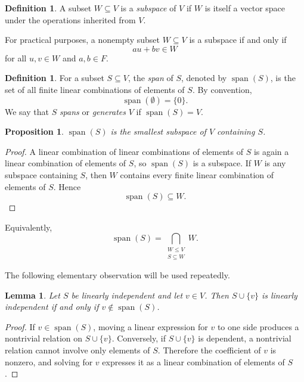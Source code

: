 \documentclass{amsbook}
\newtheorem{lemma}[theorem]{Lemma}
\newtheorem{proposition}[theorem]{Proposition}
\theoremstyle{definition}
\newtheorem{definition}[theorem]{Definition}
\theoremstyle{remark}
\numberwithin{section}{chapter}
\numberwithin{equation}{chapter}
\begin{document}
\begin{definition}
	A subset $W\subseteq V$ is a \emph{subspace} of $V$ if $W$ is itself a vector space under the operations inherited from $V$.
\end{definition}

For practical purposes, a nonempty subset $W\subseteq V$ is a subspace if and only if
\[
au+bv\in W
\]
for all $u,v\in W$ and $a,b\in F$.

\begin{definition}
	For a subset $S\subseteq V$, the \emph{span} of $S$, denoted by $\operatorname{span}(S)$, is the set of all finite linear combinations of elements of $S$. By convention,
	\[
	\operatorname{span}(\emptyset)=\{0\}.
	\]
	We say that $S$ \emph{spans} or \emph{generates} $V$ if $\operatorname{span}(S)=V$.
\end{definition}

\begin{proposition}\label{prop:span-smallest}
	$\operatorname{span}(S)$ is the smallest subspace of $V$ containing $S$.
\end{proposition}

\begin{proof}
	A linear combination of linear combinations of elements of $S$ is again a linear combination of elements of $S$, so $\operatorname{span}(S)$ is a subspace. If $W$ is any subspace containing $S$, then $W$ contains every finite linear combination of elements of $S$. Hence
	\[
	\operatorname{span}(S)\subseteq W.
	\]
\end{proof}

Equivalently,
\[
\operatorname{span}(S)
=
\bigcap_{\substack{W\le V\\S\subseteq W}}W.
\]

The following elementary observation will be used repeatedly.

\begin{lemma}\label{lem:add-independent}
	Let $S$ be linearly independent and let $v\in V$. Then $S\cup\{v\}$ is linearly independent if and only if $v\notin\operatorname{span}(S)$.
\end{lemma}

\begin{proof}
	If $v\in\operatorname{span}(S)$, moving a linear expression for $v$ to one side produces a nontrivial relation on $S\cup\{v\}$. Conversely, if $S\cup\{v\}$ is dependent, a nontrivial relation cannot involve only elements of $S$. Therefore the coefficient of $v$ is nonzero, and solving for $v$ expresses it as a linear combination of elements of $S$.
\end{proof}
\end{document}
